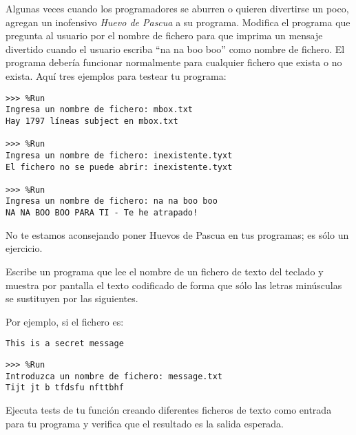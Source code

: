 \begin{ejercicio}
Algunas veces cuando los programadores se aburren o
quieren divertirse un poco, agregan un inofensivo \emph{Huevo de Pascua}
a su programa. Modifica el programa que pregunta al usuario por el
nombre de fichero para que imprima un mensaje divertido cuando el
usuario escriba ``na na boo boo'' como nombre de fichero. El programa
debería funcionar normalmente para cualquier fichero que exista o no
exista. Aquí tres ejemplos para testear tu programa:\\

\begin{Verbatim}[frame=single]
>>> %Run 
Ingresa un nombre de fichero: mbox.txt
Hay 1797 líneas subject en mbox.txt

>>> %Run 
Ingresa un nombre de fichero: inexistente.tyxt
El fichero no se puede abrir: inexistente.tyxt

>>> %Run 
Ingresa un nombre de fichero: na na boo boo
NA NA BOO BOO PARA TI - Te he atrapado!
\end{Verbatim}

No te estamos aconsejando poner Huevos de Pascua en tus
programas; es sólo un ejercicio.
\end{ejercicio}



\begin{ejercicio}
Escribe un programa que lee el nombre de un fichero de texto del teclado y muestra por pantalla el texto codificado de forma que sólo las letras minúsculas se sustituyen por las siguientes.

Por ejemplo, si el fichero es:\\

\begin{Verbatim}[frame=single, label={\em message.txt}]
This is a secret message
\end{Verbatim}


\begin{Verbatim}[frame=single]
>>> %Run 
Introduzca un nombre de fichero: message.txt
Tijt jt b tfdsfu nfttbhf
\end{Verbatim}

Ejecuta tests de tu función creando diferentes ficheros de texto como entrada para tu programa y verifica que el resultado es la salida esperada.



\end{ejercicio}


